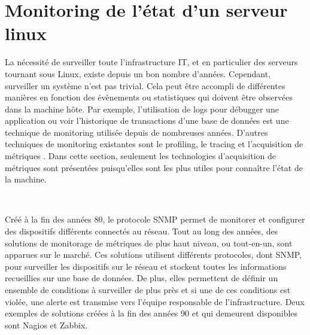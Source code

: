 \section{Monitoring de l'état d'un serveur linux}

La nécessité de surveiller toute l’infrastructure IT, et en particulier des serveurs tournant sous Linux, existe depuis un bon nombre d’années. Cependant, surveiller un système n’est pas trivial. Cela peut être accompli de différentes manières en fonction des évènements ou statistiques qui doivent être observées dans la machine hôte. Par exemple, l’utilisation de logs pour débugger une application ou voir l’historique de transactions d’une base de données est une technique de monitoring utilisée depuis de nombreuses années. D’autres techniques de monitoring existantes sont le profiling, le tracing et l’acquisition de métriques \cite{brazil2018prometheus}. Dans cette section, seulement les technologies d’acquisition de métriques sont présentées puisqu’elles sont les plus utiles pour connaître l’état de la machine.

~

\noindent
Créé à la fin des années 80, le protocole SNMP \cite{RFC1098, RFC1157} permet de monitorer et configurer des dispositifs différents connectés au réseau. Tout au long des années, des solutions de monitorage de métriques de plus haut niveau, ou tout-en-un, sont apparues sur le marché. Ces solutions utilisent différents protocoles, dont SNMP, pour surveiller les dispositifs sur le réseau et stockent toutes les informations recueillies sur une base de données. De plus, elles permettent de définir un ensemble de conditions à surveiller de plus près et si une de ces conditions est violée, une alerte est transmise vers l’équipe responsable de l’infrastructure. Deux exemples de solutions créées à la fin des années 90 et qui demeurent disponibles sont Nagios et Zabbix.

~

